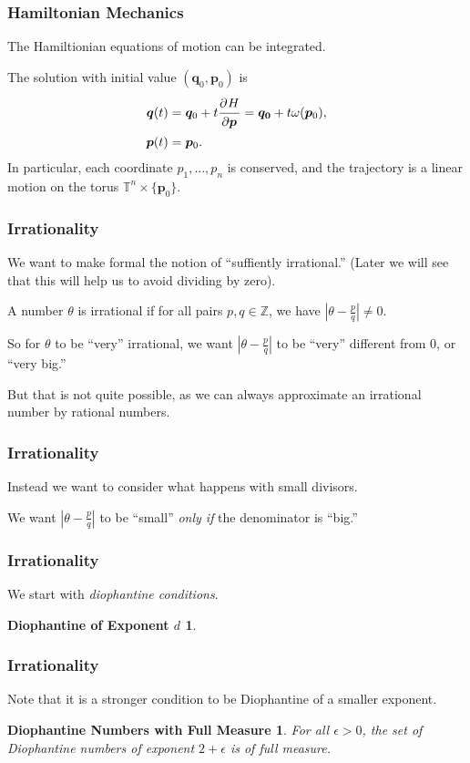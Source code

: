 \documentclass{beamer}
\newcommand{\Z}{\mathbb{Z}}
\newcommand{\bp}[1]{\bm{#1}}
\newcommand\pd[3][]{\frac{\strut\partial^{#1}#2}{\strut\partial#3^{#1}}}
\begin{document}
\begin{frame}
  \frametitle{Hamiltonian Mechanics}
  The Hamiltionian equations of motion can be integrated.

  The solution with initial value $(\bp{q}_0, \bp{p}_0)$ is
  \begin{align*}
    \bp{q}(t) &= \bp{q}_0 + t \pd{H}{\bp{p}} = \bp{q_0} + t \omega(\bp{p}_0),\\
    \bp{p}(t) &= \bp{p}_0.
  \end{align*}
  In particular, each coordinate $p_1, \ldots, p_n$ is conserved, and the
  trajectory is a linear motion on the torus $\mathbb{T}^n \times \{\bp{p}_0\}$.
\end{frame}

\begin{frame}
  \frametitle{Irrationality}
  We want to make formal the notion of ``suffiently irrational.''
  (Later we will see that this will help us to avoid dividing by zero).  

  A number $\theta$ is irrational if for all pairs $p, q \in \Z$, we have
  $\left|\theta - \frac{p}{q}\right| \neq 0$.

  So for $\theta$ to be ``very'' irrational, we want $\left|\theta -
    \frac{p}{q}\right|$ to be ``very'' different from $0$, or ``very big.''

  But that is not quite possible, as we can always approximate an irrational
  number by rational numbers.
\end{frame}

\begin{frame}
  \frametitle{Irrationality}
  Instead we want to consider what happens with small divisors.

  We want $\left| \theta - \frac{p}{q} \right|$ to be ``small'' \emph{only if}
  the denominator is ``big.''
\end{frame}

\begin{frame}
  \frametitle{Irrationality}
  We start with \emph{diophantine conditions}.
  \newtheorem{dionum}{Diophantine of Exponent $d$}
  \begin{dionum}
    \dionumber{}
  \end{dionum}
\end{frame}

\begin{frame}
  \frametitle{Irrationality}
  Note that it is a stronger condition to be Diophantine of a smaller exponent.
  
  \newtheorem{diomany}{Diophantine Numbers with Full Measure}
  \begin{diomany}
    For all $\epsilon > 0$, the set of Diophantine numbers of exponent $2 +
    \epsilon$ is of full measure.
  \end{diomany}
\end{frame}
\end{document}
